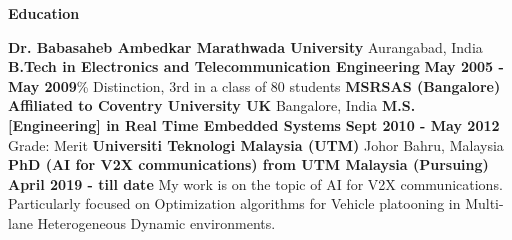 \begin{center}
    \textbf{Education}
\end{center}

\textbf{Dr. Babasaheb Ambedkar Marathwada University}   \hfill{Aurangabad, India}\newline
\textbf{B.Tech in Electronics and Telecommunication Engineering} \hfill\textbf{May 2005 - May 2009}\% Distinction, 3rd in a class of 80 students
\vspace{12pt}
\newline
\textbf{MSRSAS (Bangalore) Affiliated to Coventry University UK}    \hfill{Bangalore, India}\newline
\textbf{M.S. [Engineering] in Real Time Embedded Systems} \hfill\textbf{Sept 2010 - May 2012}\newline
Grade: Merit
\vspace{12pt}
\newline
\textbf{Universiti Teknologi Malaysia (UTM)}  \hfill{Johor Bahru, Malaysia }\newline
\textbf{PhD (AI for V2X communications) from UTM Malaysia (Pursuing)} \hfill \textbf{April 2019 - till date}\newline
My work is on the topic of AI for V2X communications. Particularly focused on Optimization algorithms for Vehicle
platooning in Multi-lane Heterogeneous Dynamic environments.